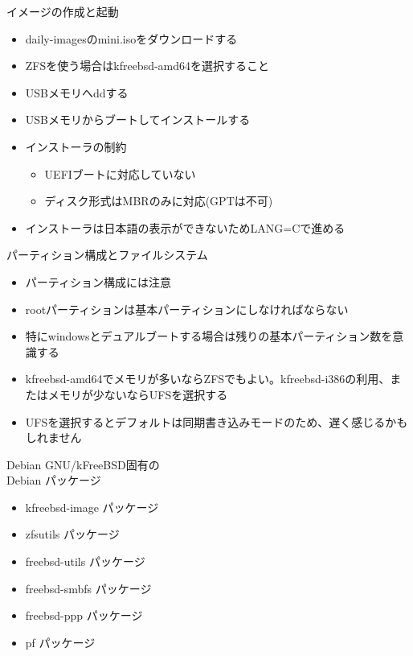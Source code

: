 \begin{frame}[containsverbatim]{イメージの作成と起動}
  \begin{itemize}
  \item daily-imagesのmini.isoをダウンロードする
  \item ZFSを使う場合はkfreebsd-amd64を選択すること
  \item USBメモリへddする
  \item USBメモリからブートしてインストールする
  \item インストーラの制約
    \begin{itemize}
    \item UEFIブートに対応していない
    \item ディスク形式はMBRのみに対応(GPTは不可)
    \end{itemize}
  \item インストーラは日本語の表示ができないためLANG=Cで進める
  \end{itemize}
\end{frame}

\begin{frame}[containsverbatim]{パーティション構成とファイルシステム}
  \begin{itemize}
  \item パーティション構成には注意
  \item rootパーティションは基本パーティションにしなければならない
  \item 特にwindowsとデュアルブートする場合は残りの基本パーティション数を意識する
  \item kfreebsd-amd64でメモリが多いならZFSでもよい。kfreebsd-i386の利用、またはメモリが少ないならUFSを選択する
  \item UFSを選択するとデフォルトは同期書き込みモードのため、遅く感じるかもしれません
  \end{itemize}
\end{frame}




\begin{frame}[containsverbatim]{Debian GNU/kFreeBSD固有の\\Debian パッケージ}
  \begin{itemize}
  \item kfreebsd-image パッケージ
  \item zfsutils パッケージ    
  \item freebsd-utils パッケージ
  \item freebsd-smbfs パッケージ
  \item freebsd-ppp パッケージ
  \item pf パッケージ
  \end{itemize}
\end{frame}


